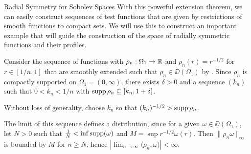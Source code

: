\begin{chapter}{Radial Symmetry for Sobolev Spaces}
With this powerful extension theorem, we can easily construct sequences of test functions that are given by restrictions of smooth functions to compact sets.
We will use this to construct an important example that will guide the construction of the space of radially symmetric functions and their profiles.

Consider the sequence of functions with $\rho_n:\Omega_1 \to \mathbb R$ and $\rho_n(r) = r^{-1/2}$ for $r\in [1/n,1]$ that are smoothly extended such that $\rho_n \in \DD(\Omega_1)$ by .
Since $\rho_n$ is compactly supported on $\Omega_1 = (0,\infty)$, there exists $\delta>0$ and a sequence $(k_n)$ such that $0<k_n<1/n$ with $\operatorname*{supp} \rho_n \subseteq \left[k_n,1+\delta\right]$.
\begin{com}
Without loss of generality, choose $k_n$ so that $(k_n)^{-1/2} > \operatorname*{supp} \rho_n$.
\end{com}
The limit of this sequence defines a distribution, since for a given $\omega \in \DD(\Omega_1)$, let $N>0$ such that $\frac 1N < \inf \operatorname*{supp} (\omega)$ and $M = \sup r^{-1/2}\omega(r)$. 
Then $\|\rho_n \omega \|_{\infty}$ is bounded by $M$ for $n\ge N$, hence $|\lim_{n\to\infty} \langle \rho_n,\omega\rangle| < \infty$.


\end{chapter}
